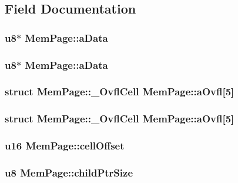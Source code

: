 \subsection{Field Documentation}
\subsubsection{\setlength{\rightskip}{0pt plus 5cm}\bf{u8}$\ast$ \bf{Mem\-Page::a\-Data}}\label{structMemPage_6e9ecae326fb3181d70aa86de29c4529}


\subsubsection{\setlength{\rightskip}{0pt plus 5cm}\bf{u8}$\ast$ \bf{Mem\-Page::a\-Data}}\label{structMemPage_6e9ecae326fb3181d70aa86de29c4529}


\subsubsection{\setlength{\rightskip}{0pt plus 5cm}struct \bf{Mem\-Page::\_\-Ovfl\-Cell}  \bf{Mem\-Page::a\-Ovfl}[5]}\label{structMemPage_51500580f36ccfd32713f19056e0e81e}


\subsubsection{\setlength{\rightskip}{0pt plus 5cm}struct \bf{Mem\-Page::\_\-Ovfl\-Cell}  \bf{Mem\-Page::a\-Ovfl}[5]}\label{structMemPage_51500580f36ccfd32713f19056e0e81e}


\subsubsection{\setlength{\rightskip}{0pt plus 5cm}\bf{u16} \bf{Mem\-Page::cell\-Offset}}\label{structMemPage_8928d715f4adb22a7d0df07decd7813d}


\subsubsection{\setlength{\rightskip}{0pt plus 5cm}\bf{u8} \bf{Mem\-Page::child\-Ptr\-Size}}\label{structMemPage_8db7f3741784cff6025fd5a33a58dfdc}


